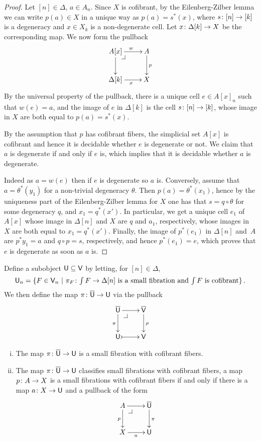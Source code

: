 \documentclass[reqno,10pt,a4paper,oneside,draft]{amsart}
\begin{document}
\begin{proof} Let $[n] \in \Delta$, $a \in A_n$. Since $X$ is cofibrant, by the Eilenberg-Zilber lemma we can write $p(a) \in X$ in a unique way as $p(a) =s^*(x)$, where $s \colon [n] \to [k]$ is a degeneracy and 
$x \in X_k$ is a non-degenerate cell. Let $x \colon \Delta[k] \rightarrow X$ be the corresponding map. We now form the pullback
\[
\xymatrix{
A[x] \ar[r]^w \ar[d] \drpullback & A  \ar[d]^{p}  \\
\Delta[k] \ar[r]_{x} & X }
\]
By the universal property of the pullback, there is a unique cell $e \in A[x]_n$ such that $w(e)=a$, and the image of $e$ in $\Delta[k]$ is the cell $s \colon [n] \to [k]$, whose image in $X$ are both equal to $p(a)=s^*(x)$.

By the assumption that $p$ has cofibrant fibers, the simplicial set $A[x]$ is cofibrant and hence it is decidable whether $e$ is degenerate or not. We claim that $a$ is degenerate if and only if $e$ is, which implies that it is decidable whether $a$ is degenerate.

  Indeed as $a = w(e)$ then if $e$ is degenerate so $a$ is. Conversely, assume that $a=\theta^*(y_1)$ for a non-trivial degeneracy $\theta$. Then $p(a)=\theta^*(x_1)$, hence by the uniqueness part of the Eilenberg-Zilber lemma for $X$ one has that $s=q \circ \theta$ for some degeneracy $q$, and $x_1 = q^*(x')$. In particular, we get a unique cell $e_1$ of $A[x]$ whose image in $\Delta[n]$ and $X$ are  $q$ and $a_1$, respectively, whose images in $X$ are both equal to $x_1=q^*(x')$. Finally, the image of $p^*(e_1)$ in $\Delta[n]$ and~$A$ are  $p^* y_1 =a$ and $q \circ p =s$, respectively, and hence $p^*(e_1) =e$, which proves that $e$ is degenerate as soon as $a$ is.
\end{proof} 


Define a subobject $\mathsf{U} \subseteq \mathsf{V}$ by letting, for $[n] \in \Delta$, 
\[
\mathsf{U}_n = \{ F \in \mathsf{V}_n \ | \ \pi_F \colon \textstyle{\int F} \to \Delta[n] \text{ is a small fibration and 
$ \textstyle{\int F}$ is cofibrant} \} \, .
\]
We then define the map $\pi \colon \overline{\mathsf{U}} \to \mathsf{U}$ via the pullback 
\[
\xymatrix{
\UU \ar[r] \ar[d]_\pi \drpullback  & \VV \ar[d]^\rho \\
\U \ar@{>->}[r] & \V }
\]




\begin{proposition} \label{thm:universe-u}  \hfill 
\begin{enumerate}[(i)] 
\item The map $\pi \colon \overline{\mathsf{U}} \to \mathsf{U}$ is a small fibration with cofibrant fibers.
\item The map $\pi \colon \overline{\mathsf{U}} \to \mathsf{U}$ classifies small fibrations with cofibrant fibers, \ie 
a map $p \colon A \to X$ is a small fibrations with cofibrant fibers if and only if 
there is a map $a \colon X \to \mathsf{U}$ and a pullback  of the form
\[
\xymatrix{
A \ar[r] \ar[d]_p \drpullback & \UU \ar[d]^\pi \\
X \ar[r]_{a} & \U }
\]
\end{enumerate}
\end{proposition}
\end{document}
